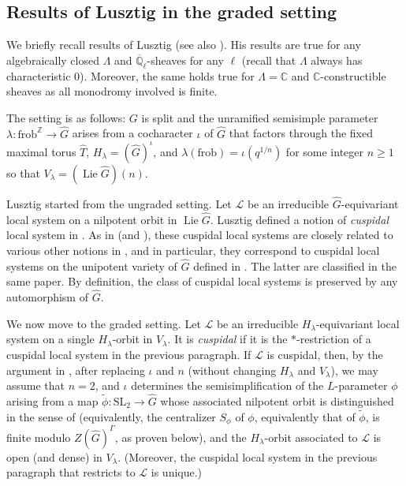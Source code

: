 \documentclass{amsart}
\theoremstyle{definition}
\theoremstyle{remark}
\numberwithin{equation}{section}
\DeclareMathOperator{\Lie}{Lie}
\newcommand{\mc}{\mathcal}
\newcommand{\Q}{\mathbb{Q}}
\newcommand{\C}{\mathbb{C}}
\newcommand{\Z}{\mathbb{Z}}
\newcommand{\SL}{\mathrm{SL}}
\newcommand{\wh}{\widehat}
\newcommand{\frob}{\mathrm{frob}}
\begin{document}
\subsection{Results of Lusztig in the graded setting}{\label{ss: lusztiggraded}}
We briefly recall results of Lusztig \cite{LusztigGraded} (see also \cite{Chatterjee}). His results are true for any algebraically closed $\Lambda$ and $\overline{\Q}_{\ell}$-sheaves for any $\ell$ (recall that $\Lambda$ always has characteristic $0$). Moreover, the same holds true for $\Lambda=\C$ and $\C$-constructible sheaves as all monodromy involved is finite. 


The setting is as follows: $G$ is split and the unramified semisimple parameter $\lambda\colon \frob^\Z\to \wh G$ arises from a cocharacter $\iota$ of $\wh G$ that factors through the fixed maximal torus $\wh T$, $H_{\lambda}=(\wh G)^\iota$, and $\lambda(\frob)=\iota(q^{1/n})$ for some integer $n\geq 1$ so that $V_\lambda=(\Lie \wh{G})(n)$. 

Lusztig started from the ungraded setting. Let $\mc L$ be an irreducible $\wh G$-equivariant local system on a nilpotent orbit in $\Lie \wh {G}$. Lusztig defined a notion of \emph{cuspidal} local system in \cite[\S 2.2]{LusztigCuspidalI}. As in \cite[p.~179]{LusztigFourier} (and \cite{LusztigCharacterI, LusztigCharacterII-III, LusztigCharacterV}), these cuspidal local systems are closely related to various other notions in \cite{LusztigIntersection, LusztigCharacterI, LusztigCharacterII-III}, and in particular, they correspond to cuspidal local systems on the unipotent variety of $\wh G$ defined in \cite[Definition 2.4]{LusztigIntersection}. The latter are classified in the same paper. By definition, the class of cuspidal local systems is preserved by any automorphism of $\wh G$. 

We now move to the graded setting. Let $\mc L$ be an irreducible $H_{\lambda}$-equivariant local system on a single $H_{\lambda}$-orbit in $V_{\lambda}$. It is \emph{cuspidal} \cite[\S 4.4]{LusztigGraded} if it is the $*$-restriction of a cuspidal local system in the previous paragraph. If $\mc L$ is cuspidal, then, by the argument in \cite[\S 4.3]{LusztigIntersection}, after replacing $\iota$ and $n$ (without changing $H_{\lambda}$ and $V_{\lambda}$), we may assume that $n=2$, and $\iota$ determines the semisimplification of the $L$-parameter $\phi$ arising from a map $\tilde{\phi}\colon \SL_2 \to \wh G$ whose associated nilpotent orbit is distinguished in the sense of \cite{BalaCarterI} (equivalently, the centralizer $S_\phi$ of $\phi$, equivalently that of $\tilde{\phi}$, is finite modulo $Z(\wh{G})^{\Gamma}$, as proven below), and the $H_{\lambda}$-orbit associated to $\mc{L}$ is open (and dense) in $V_{\lambda}$. 
(Moreover, the cuspidal local system in the previous paragraph that restricts to $\mc L$ is unique.)
\end{document}
